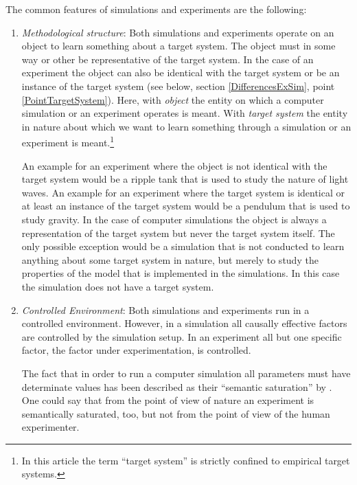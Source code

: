 \documentclass[onecollarge]{STJour}
\numberwithin{equation}{section}
\begin{document}
The common features of simulations and experiments are the following:

\begin{enumerate}

\item {\em Methodological structure}: Both simulations and experiments operate on an object to learn something about a target system. The object must in some way or other be representative of the target system. In the case of an experiment the object can also be identical with the target system or be an instance of the target system (see below, section \ref{DifferencesExSim}, point \ref{PointTargetSystem}). Here, \label{ObjectTargetSystem} with \emph{object}  the entity on which a computer simulation or an experiment operates is meant. With \emph{target system} the entity in nature about which we want to learn something through a simulation or an experiment is meant.\footnote{In this article the term ``target system'' is strictly confined to empirical target systems.}

An example for an experiment where the object is not identical with the target system would be a ripple tank that is used to study the nature of light waves. An example for an experiment where the target system is identical or at least an instance of the target system would be a pendulum that is used to study gravity. In the case of computer simulations the object is always a representation of the target system but never the target system itself. The only possible exception would be a simulation that is not conducted to learn anything about some target system in nature, but merely to study the properties of the model that is implemented in the simulations. In this case the simulation does not have a target system.  
  
\item {\em Controlled Environment}: Both simulations and experiments run in a controlled environment. However, in a simulation all causally effective factors are controlled by the simulation setup. In an experiment all but one specific factor, the factor under experimentation, is controlled.

The fact that in order to run a computer simulation all parameters must have determinate values has been described as their ``semantic saturation'' by \citet*[p. 572]{barberousse-et-al:2009}. One could say that from the point of view of nature an experiment is semantically saturated, too, but not from the point of view of the human experimenter.
  

\end{enumerate}
\end{document}
